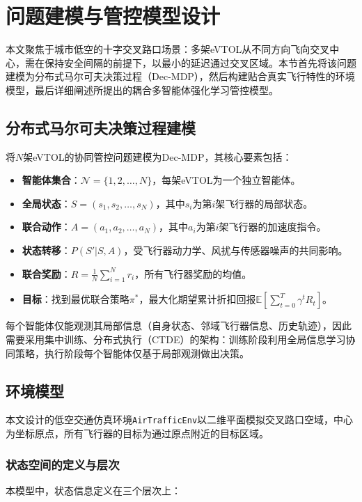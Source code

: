 \documentclass[12pt,a4paper,UTF8]{ctexart}
\begin{document}
\section{问题建模与管控模型设计}
本文聚焦于城市低空的十字交叉路口场景：多架eVTOL从不同方向飞向交叉中心，需在保持安全间隔的前提下，以最小的延迟通过交叉区域。本节首先将该问题建模为分布式马尔可夫决策过程（Dec-MDP），然后构建贴合真实飞行特性的环境模型，最后详细阐述所提出的耦合多智能体强化学习管控模型。

\subsection{分布式马尔可夫决策过程建模}
将$N$架eVTOL的协同管控问题建模为Dec-MDP，其核心要素包括：
\begin{itemize}
    \item \textbf{智能体集合}：$\mathcal{N} = \{1, 2, \ldots, N\}$，每架eVTOL为一个独立智能体。
    \item \textbf{全局状态}：$S = (s_1, s_2, \ldots, s_N)$，其中$s_i$为第$i$架飞行器的局部状态。
    \item \textbf{联合动作}：$A = (a_1, a_2, \ldots, a_N)$，其中$a_i$为第$i$架飞行器的加速度指令。
    \item \textbf{状态转移}：$P(S'|S, A)$，受飞行器动力学、风扰与传感器噪声的共同影响。
    \item \textbf{联合奖励}：$R = \frac{1}{N}\sum_{i=1}^{N} r_i$，所有飞行器奖励的均值。
    \item \textbf{目标}：找到最优联合策略$\pi^*$，最大化期望累计折扣回报$\mathbb{E}[\sum_{t=0}^{T} \gamma^t R_t]$。
\end{itemize}

每个智能体仅能观测其局部信息（自身状态、邻域飞行器信息、历史轨迹），因此需要采用集中训练、分布式执行（CTDE）的架构：训练阶段利用全局信息学习协同策略，执行阶段每个智能体仅基于局部观测做出决策。

\subsection{环境模型}
本文设计的低空交通仿真环境\texttt{AirTrafficEnv}以二维平面模拟交叉路口空域，中心为坐标原点，所有飞行器的目标为通过原点附近的目标区域。

\subsubsection{状态空间的定义与层次}
本模型中，状态信息定义在三个层次上：
\end{document}
